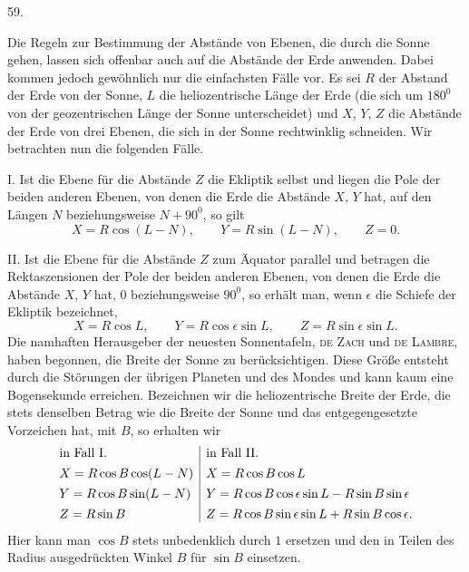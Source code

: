 \par\medskip
{}
\begin{center}59.\end{center}
Die Regeln zur Bestimmung der Abstände von Ebenen, die durch die Sonne gehen, lassen sich offenbar auch auf die Abstände der Erde anwenden. Dabei kommen jedoch gewöhnlich nur die einfachsten Fälle vor. Es sei $R$ der Abstand der Erde von der Sonne, $L$ die heliozentrische Länge der Erde (die sich um $180^0$ von der geozentrischen Länge der Sonne unterscheidet) und $X$, $Y$, $Z$ die Abstände der Erde von drei Ebenen, die sich in der Sonne rechtwinklig schneiden. Wir betrachten nun die folgenden Fälle.

I. Ist die Ebene für die Abstände $Z$ die Ekliptik selbst und liegen die Pole der beiden anderen Ebenen, von denen die Erde die Abstände $X$, $Y$ hat, auf den Längen $N$ beziehungsweise $N+90^0$, so gilt
\[
X=R\cos(L-N),\qquad Y=R\sin(L-N),\qquad Z=0.
\]

II. Ist die Ebene für die Abstände $Z$ zum Äquator parallel und betragen die Rektaszensionen der Pole der beiden anderen Ebenen, von denen die Erde die Abstände $X$, $Y$ hat, $0$ beziehungsweise $90^0$, so erhält man, wenn $\epsilon$ die Schiefe der Ekliptik bezeichnet,
\[
X=R\cos L,\qquad Y=R\cos\epsilon\sin L,\qquad Z=R\sin\epsilon\sin L.
\]
Die namhaften Herausgeber der neuesten Sonnentafeln, \textsc{de Zach} und \textsc{de Lambre}, haben begonnen, die Breite der Sonne zu berücksichtigen. Diese Größe entsteht durch die Störungen der übrigen Planeten und des Mondes und kann kaum eine Bogensekunde erreichen. Bezeichnen wir die heliozentrische Breite der Erde, die stets denselben Betrag wie die Breite der Sonne und das entgegengesetzte Vorzeichen hat, mit $B$, so erhalten wir
\[
\begin{array}{@{}l|l@{}}
\text{in Fall I.}&\text{in Fall II.}\\[.4em]
X=R\cos B\cos(L-N)&X=R\cos B\cos L\\[.4em]
Y=R\cos B\sin(L-N)&Y=R\cos B\cos\epsilon\sin L-R\sin B\sin\epsilon\\[.4em]
Z=R\sin B&Z=R\cos B\sin\epsilon\sin L+R\sin B\cos\epsilon.
\end{array}
\]
Hier kann man $\cos B$ stets unbedenklich durch $1$ ersetzen und den in Teilen des Radius ausgedrückten Winkel $B$ für $\sin B$ einsetzen.

